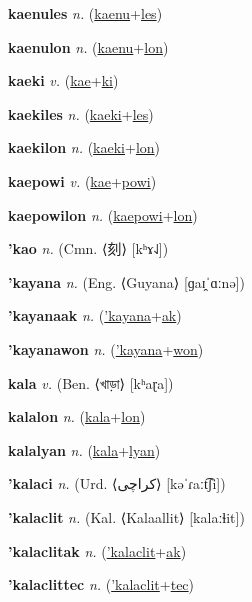 \textbf{\hypertarget{kaenules}{kaenules}} \textit{n.} (\hyperlink{kaenu}{kaenu}+\allowbreak \hyperlink{les}{les})


\textbf{\hypertarget{kaenulon}{kaenulon}} \textit{n.} (\hyperlink{kaenu}{kaenu}+\allowbreak \hyperlink{lon}{lon})


\textbf{\hypertarget{kaeki}{kaeki}} \textit{v.} (\hyperlink{kae}{kae}+\allowbreak \hyperlink{ki}{ki})


\textbf{\hypertarget{kaekiles}{kaekiles}} \textit{n.} (\hyperlink{kaeki}{kaeki}+\allowbreak \hyperlink{les}{les})


\textbf{\hypertarget{kaekilon}{kaekilon}} \textit{n.} (\hyperlink{kaeki}{kaeki}+\allowbreak \hyperlink{lon}{lon})


\textbf{\hypertarget{kaepowi}{kaepowi}} \textit{v.} (\hyperlink{kae}{kae}+\allowbreak \hyperlink{powi}{powi})


\textbf{\hypertarget{kaepowilon}{kaepowilon}} \textit{n.} (\hyperlink{kaepowi}{kaepowi}+\allowbreak \hyperlink{lon}{lon})


\textbf{\hypertarget{'kao}{'kao}} \textit{n.} (Cmn. ⟨{\chinese{}刻}⟩ [kʰɤ˨˩])


\textbf{\hypertarget{'kayana}{'kayana}} \textit{n.} (Eng. ⟨Guyana⟩ [ɡaɪ̯ˈɑːnə])


\textbf{\hypertarget{'kayanaak}{'kayanaak}} \textit{n.} (\hyperlink{'kayana}{'kayana}+\allowbreak \hyperlink{ak}{ak})


\textbf{\hypertarget{'kayanawon}{'kayanawon}} \textit{n.} (\hyperlink{'kayana}{'kayana}+\allowbreak \hyperlink{won}{won})


\textbf{\hypertarget{kala}{kala}} \textit{v.} (Ben. ⟨{\bengali{}খাড়া}⟩ [kʰaɽa])


\textbf{\hypertarget{kalalon}{kalalon}} \textit{n.} (\hyperlink{kala}{kala}+\allowbreak \hyperlink{lon}{lon})


\textbf{\hypertarget{kalalyan}{kalalyan}} \textit{n.} (\hyperlink{kala}{kala}+\allowbreak \hyperlink{lyan}{lyan})


\textbf{\hypertarget{'kalaci}{'kalaci}} \textit{n.} (Urd. ⟨{\arabics{}کراچی‎}⟩ [kəˈɾaːt͡ʃi])


\textbf{\hypertarget{'kalaclit}{'kalaclit}} \textit{n.} (Kal. ⟨Kalaallit⟩ [kalaːɬit])


\textbf{\hypertarget{'kalaclitak}{'kalaclitak}} \textit{n.} (\hyperlink{'kalaclit}{'kalaclit}+\allowbreak \hyperlink{ak}{ak})


\textbf{\hypertarget{'kalaclittec}{'kalaclittec}} \textit{n.} (\hyperlink{'kalaclit}{'kalaclit}+\allowbreak \hyperlink{tec}{tec})


